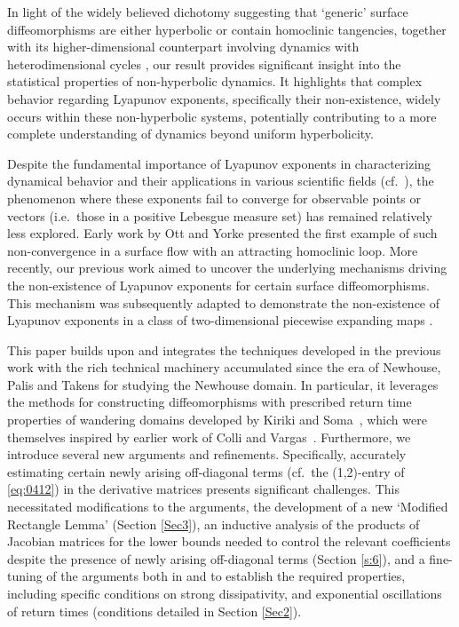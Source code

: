 \documentclass{amsart}
\theoremstyle{plain}
\theoremstyle{definition}
\theoremstyle{remark}
\numberwithin{equation}{section}
\begin{document}
In light of the widely believed dichotomy suggesting that `generic' surface diffeomorphisms are either 
hyperbolic
or 
contain homoclinic tangencies, together with its higher-dimensional counterpart involving dynamics with heterodimensional cycles \cite{PS2000,BDP2003,P2005}, our result provides significant insight into the statistical properties of non-hyperbolic dynamics. It highlights that complex behavior regarding Lyapunov exponents, specifically their non-existence, widely occurs within these non-hyperbolic systems, potentially contributing to a more complete understanding of dynamics beyond uniform hyperbolicity.

Despite the fundamental importance of Lyapunov exponents in characterizing dynamical behavior and their applications in various scientific fields (cf.~\cite{Viana2014}), the phenomenon where these exponents fail to converge for observable points or vectors (i.e.~those in a positive Lebesgue measure set) has remained relatively less explored.
Early work by Ott and Yorke \cite{OY2008} presented the first example of such non-convergence in a surface flow with an attracting homoclinic loop.
More recently, our previous work \cite{KLNS2022} aimed to uncover the underlying mechanisms driving the non-existence of Lyapunov exponents
 for certain surface diffeomorphisms.
This mechanism was subsequently adapted to demonstrate the non-existence of Lyapunov exponents in a class of two-dimensional piecewise expanding maps \cite{NSY2023}.

This paper builds upon and integrates the techniques developed in the previous work \cite{KLNS2022} with the rich technical machinery accumulated since the era of Newhouse, Palis and Takens \cite{PT1995} for studying the Newhouse domain.
 In particular, it leverages the methods for constructing diffeomorphisms with prescribed return time properties of wandering domains developed by Kiriki and Soma~\cite{KS2017}, which were themselves inspired by earlier work of Colli and Vargas~\cite{CV2001}.
 Furthermore, we introduce several new arguments and refinements.
Specifically, 
accurately estimating certain newly arising off-diagonal terms (cf.~the (1,2)-entry of \eqref{eq:0412}) in the derivative matrices presents significant challenges.
This necessitated modifications to the arguments, the development of a new `Modified Rectangle Lemma' (Section \ref{Sec3}), an inductive analysis of the products of Jacobian matrices for the lower bounds needed to control the relevant coefficients despite the presence of newly arising off-diagonal terms (Section \ref{s:6}),
and a fine-tuning of the arguments both in \cite{KS2017} and \cite{KLNS2022} to establish the required properties, including specific conditions on 
strong dissipativity, and exponential oscillations of return times (conditions detailed in Section \ref{Sec2}).
\end{document}
